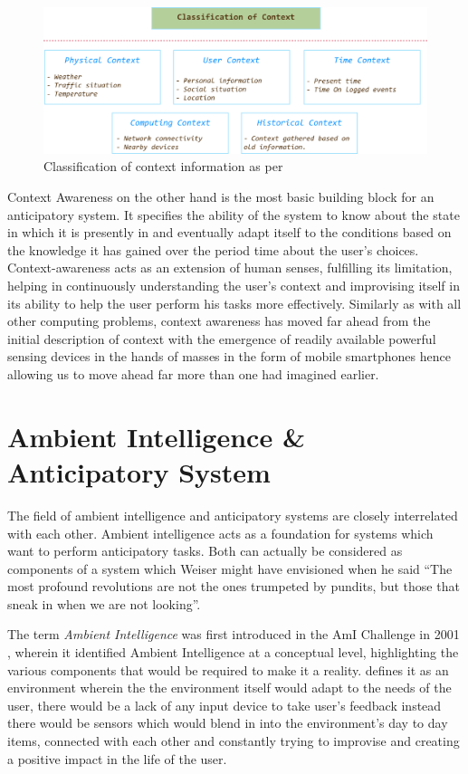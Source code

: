 \documentclass[12pt]{report}
\begin{document}
\begin{figure}[hbtp]
 \centering
 \includegraphics[width=120mm]{Classification_Of_Context.png}
  \caption[Classification of context.]{Classification of context information as per \cite{schilit1994context}}
 \label{figure:ContextClassification}
\end{figure}

Context Awareness on the other hand is the most basic building block for an anticipatory system. It specifies the ability of the system to know about the state in which it is presently in and eventually adapt itself to the conditions based on the knowledge it has gained over the period time about the user's choices. Context-awareness acts as an extension of human senses, fulfilling its limitation, helping in continuously understanding the user's context and improvising itself in its ability to help the user perform his tasks more effectively. Similarly as with all other computing problems, context awareness has moved far ahead from the initial description of context\cite{schilit1994disseminating} with the emergence of readily available powerful sensing devices in the hands of masses in the form of mobile smartphones hence allowing us to move ahead far more than one had imagined earlier.


\chapter{Ambient Intelligence \& Anticipatory System}

The field of ambient intelligence and anticipatory systems are closely interrelated with each other. Ambient intelligence acts as a foundation for systems which want to perform anticipatory tasks. Both can actually be considered as components of a system which Weiser might have envisioned when he said ``The most profound revolutions are not the ones trumpeted by pundits, but those that sneak in when we are not looking''\cite{weiser1991computer}.

The term \textit{Ambient Intelligence} was first introduced in the AmI Challenge in 2001 \cite{ducatel2001scenarios}, wherein it identified Ambient Intelligence at a conceptual level, highlighting the various components that would be required to make it a reality. \cite{sadri2011ambient} defines it as an environment wherein the the environment itself would adapt to the needs of the user, there would be a lack of any input device to take user's feedback instead there would be sensors which would blend in into the environment's day to day items, connected with each other and constantly trying to improvise and creating a positive impact in the life of the user.
\end{document}
